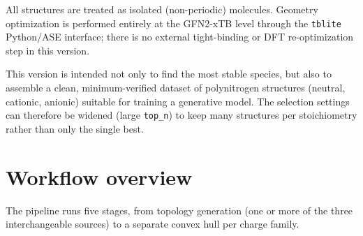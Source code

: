 \documentclass[11pt,a4paper]{article}
\begin{document}
All structures are treated as isolated (non-periodic) molecules. Geometry
optimization is performed entirely at the GFN2-xTB level through the
\texttt{tblite} Python/ASE interface; there is no external tight-binding or
DFT re-optimization step in this version.

\begin{remark}
This version is intended not only to find the most stable species, but also
to assemble a clean, minimum-verified dataset of polynitrogen structures
(neutral, cationic, anionic) suitable for training a generative model. The
selection settings can therefore be widened (large \texttt{top\_n}) to keep
many structures per stoichiometry rather than only the single best.
\end{remark}

\section{Workflow overview}

The pipeline runs five stages, from topology generation (one or more of the
three interchangeable sources) to a separate convex hull per charge family.
\end{document}
